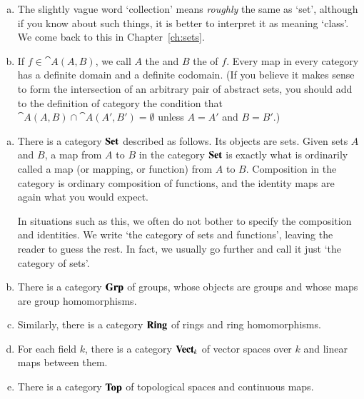 \begin{remarks}
\begin{enumerate}[(b)]
\item
The slightly vague word `collection'%
%
%
means \emph{roughly} the same as `set', although if you know about such
things, it is better to interpret it as meaning `class'.%
%
%
We come back to this in Chapter~\ref{ch:sets}.

\item
If $f \in \cat{A}(A, B)$, we call $A$ the %
%
%
and $B$ the %
%
%
of $f$.  Every map in every category has a definite domain and a definite
codomain.  (If you believe it makes sense to form the intersection of an
arbitrary pair of abstract sets, you should add to the definition of
category the condition that $\cat{A}(A, B) \cap \cat{A}(A', B') =
\emptyset$ unless $A = A'$ and $B = B'$.)
\end{enumerate}
\end{remarks}

\begin{examples}
\label{egs:cats-of}
%
\begin{enumerate}[(b)]
\item
There is a category $\mathbf{Set}$%
%
%
described as follows.  Its objects are sets.%
%
%
Given sets $A$ and $B$, a map from $A$ to $B$ in the category $\mathbf{Set}$ is
exactly what is ordinarily called a map (or mapping, or function) from $A$
to $B$.  Composition in the category is ordinary composition of functions,
and the identity maps are again what you would expect.

In situations such as this, we often do not bother to specify the
composition and identities.  We write `the category of sets and functions',
leaving the reader to guess the rest.  In fact, we usually go further and
call it just `the category of sets'.

\item
There is a category $\mathbf{Grp}$%
%
%
of groups,%
%
%
whose objects are groups and whose maps are group homomorphisms.

\item
Similarly, there is a category $\mathbf{Ring}$%
%
%
of rings%
%
%
and ring homomorphisms.

\item
For each field $k$, there is a category $\mathbf{Vect}_k$%
%
%
of vector%
%
%
spaces over $k$ and linear maps between them.

\item
There is a category $\mathbf{Top}$%
%
%
of topological%
%
%
spaces and continuous maps.
\end{enumerate}
\end{examples}

